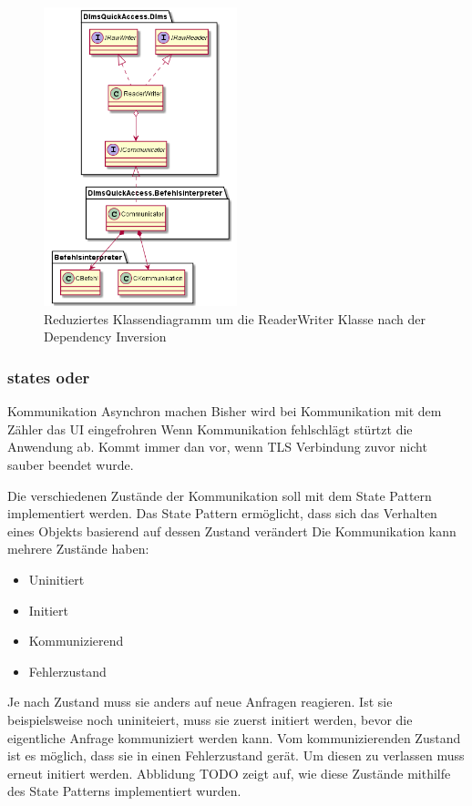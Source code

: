 \begin{figure}[H]
   \centering
   \includegraphics[width=0.5\textwidth]{gfx/dlms_nachher.png}
   \caption{
      Reduziertes Klassendiagramm um die ReaderWriter Klasse nach der Dependency Inversion
   }
   \label{fig:dlms_nachher}
\end{figure}

\subsubsection{states oder}

Kommunikation Asynchron machen
Bisher wird bei Kommunikation mit dem Zähler das UI eingefrohren
Wenn Kommunikation fehlschlägt stürtzt die Anwendung ab.
Kommt immer dan vor, wenn TLS Verbindung zuvor nicht sauber beendet wurde.

Die verschiedenen Zustände der Kommunikation soll mit dem State Pattern implementiert werden.
Das State Pattern ermöglicht, dass sich das Verhalten eines Objekts basierend auf dessen Zustand verändert \parencite{designPatterns}
Die Kommunikation kann mehrere Zustände haben:
\begin{itemize}
   \item Uninitiert
   \item Initiert
   \item Kommunizierend
   \item Fehlerzustand
\end{itemize}
Je nach Zustand muss sie anders auf neue Anfragen reagieren.
Ist sie beispielsweise noch uniniteiert, muss sie zuerst initiert werden, bevor die eigentliche Anfrage kommuniziert werden kann.
Vom kommunizierenden Zustand ist es möglich, dass sie in einen Fehlerzustand gerät.
Um diesen zu verlassen muss erneut initiert werden.
Abblidung TODO zeigt auf, wie diese Zustände mithilfe des State Patterns implementiert wurden.

